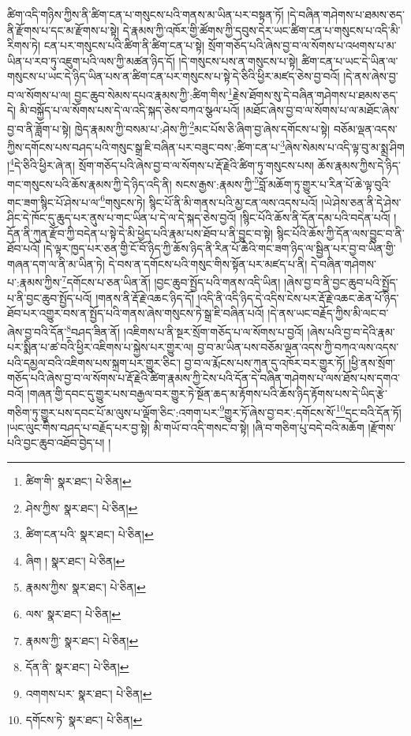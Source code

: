 ཚིག་འདི་གཉིས་ཀྱིས་ནི་ཚིག་ངན་པ་གསུངས་པའི་གནས་མ་ཡིན་པར་བསྟན་ཏོ། །དེ་བཞིན་གཤེགས་པ་ཐམས་ཅད་ནི་རྫོགས་པ་དང་མ་རྫོགས་པ་སྟེ། དེ་རྣམས་ཀྱི་འཁོར་གྱི་ཚོགས་ཀྱི་དབུས་དེར་ཡང་ཚིག་ངན་པ་གསུངས་པ་འདི་མི་རིགས་ཏེ། ངན་པར་གསུངས་པའི་ཚིག་ནི་ཚིག་ངན་པ་སྟེ། སྲོག་གཅོད་པའི་ཞེས་བྱ་བ་ལ་སོགས་པ་འཕགས་པ་མ་ཡིན་པ་རབ་ཏུ་འཇུག་པའི་ལས་ཀྱི་མཚན་ཉིད་དོ། །དེ་གསུངས་པས་ན་གསུངས་པ་སྟེ། ཚིག་ངན་པ་ཡང་དེ་ཡིན་ལ་གསུངས་པ་ཡང་དེ་ཉིད་ཡིན་པས་ན་ཚིག་ངན་པར་གསུངས་པ་སྟེ་དེ་ཅིའི་ཕྱིར་མཛད་ཅེས་བྱ་བའོ། །དེ་ནས་ཞེས་བྱ་བ་ལ་སོགས་པ་ལ། བྱང་ཆུབ་སེམས་དཔའ་རྣམས་ཀྱི་:ཚིག་གིས་\footnote{ཚིག་གི་  སྣར་ཐང་།  པེ་ཅིན། }རྗེས་ཐོགས་སུ་དེ་བཞིན་གཤེགས་པ་ཐམས་ཅད་དེ། མི་བསྐྱོད་པ་ལ་སོགས་པས་དེ་ལ་འདི་སྐད་ཅེས་བཀའ་སྩལ་པའོ། །མཐོང་ཞེས་བྱ་བ་ལ་སོགས་པ་ལ་མཐོང་ཞེས་བྱ་བ་ནི་ཟློག་པ་སྟེ། ཁྱེད་རྣམས་ཀྱི་བསམ་པ་:ཤེས་ཀྱི་\footnote{ཤེས་ཀྱིས་  སྣར་ཐང་།  པེ་ཅིན། }མང་པོས་ཅི་ཞིག་བྱ་ཞེས་དགོངས་པ་སྟེ། བཅོམ་ལྡན་འདས་ཀྱིས་དགོངས་པས་བཤད་པའི་གསུང་སྒྲ་ཇི་བཞིན་པར་བཟུང་བས་:ཚིག་ངན་པ་\footnote{ཚིག་ངན་པའི་  སྣར་ཐང་།  པེ་ཅིན། }ཞེས་སེམས་པ་འདི་ལྟ་བུ་མ་སྨྲ་ཤིག །\footnote{ཞིག །  སྣར་ཐང་།  པེ་ཅིན། }དེ་ཅིའི་ཕྱིར་ཞེ་ན། སྲོག་གཅོད་པའི་ཞེས་བྱ་བ་ལ་སོགས་པ་རྡོ་རྗེའི་ཚིག་ཏུ་གསུངས་པས། ཆོས་རྣམས་ཀྱིས་དེ་ཉིད་གང་གསུངས་པའི་ཆོས་རྣམས་ཀྱི་དེ་ཉིད་འདི་ནི། སངས་རྒྱས་:རྣམས་ཀྱི་\footnote{རྣམས་ཀྱིས་  སྣར་ཐང་།  པེ་ཅིན། }བློ་མཆོག་ཏུ་གྱུར་པ་རིན་པོ་ཆེ་ལྟ་བུའི་གང་ཟག་སྙིང་པོ་ཤེས་པ་ལ་\footnote{ལས་  སྣར་ཐང་།  པེ་ཅིན། }གསུངས་ཏེ། སྙིང་པོ་ནི་མི་གནས་པའི་མྱ་ངན་ལས་འདས་པའོ། །ཡེ་ཤེས་ཅན་ནི་དེ་ཤེས་ཤིང་དེ་ཁོང་དུ་ཆུད་པར་ནུས་པ་གང་ཡིན་པ་དེ་ལ་དེ་སྐད་ཅེས་བྱའོ། །སྙིང་པོའི་ཆོས་ནི་དོན་དམ་པའི་བདེན་པའོ། །དོན་ནི་ཀུན་རྫོབ་ཀྱི་བདེན་པ་སྟེ་དེ་མི་ཕྱེད་པའི་རྣམ་པས་ཐོབ་པ་ནི་བྱུང་བ་སྟེ། སྙིང་པོའི་ཆོས་ཀྱི་དོན་ལས་བྱུང་བ་ནི་ཐོབ་པའོ། །དེ་ལྟར་ཁྱད་པར་ཅན་གྱི་ངོ་བོ་ཉིད་ཀྱི་ཆོས་ཉིད་ནི་རིན་པོ་ཆེའི་གང་ཟག་ཉིད་ལ་སྦྱིན་པར་བྱ་བ་ཡིན་གྱི་གཞན་དག་ལ་ནི་མ་ཡིན་ཏེ། དེ་བས་ན་དགོངས་པའི་གསུང་གིས་སྟོན་པར་མཛད་པ་ནི། དེ་བཞིན་གཤེགས་པ་:རྣམས་ཀྱིས་\footnote{རྣམས་ཀྱི་  སྣར་ཐང་།  པེ་ཅིན། }དགོངས་པ་ཅན་ཡིན་ནོ། །བྱང་ཆུབ་སྤྱོད་པའི་གནས་འདི་ཡིན། །ཞེས་བྱ་བ་ནི་བྱང་ཆུབ་པའི་སྤྱོད་པ་ནི་བྱང་ཆུབ་སྤྱོད་པའོ། །གནས་ནི་རྡོ་རྗེ་འཆང་ཉིད་དོ། །འདི་ནི་འདི་ཉིད་དེ་འདིས་ངེས་པར་རྡོ་རྗེ་འཆང་ཆེན་པོ་ཉིད་ཐོབ་པར་འགྱུར་བས་ན་སྤྱོད་པའི་གནས་ཞེས་གསུངས་ཏེ་སྒྲ་ཇི་བཞིན་པའོ། །དེ་ནས་ཡང་བརྗོད་ཀྱིས་མི་ལང་བ་ཞེས་བྱ་བའི་དོན་\footnote{དོན་ནི་  སྣར་ཐང་།  པེ་ཅིན། }བཤད་ཟིན་ནོ། །འཇིགས་པ་ནི་སྔར་སྲོག་གཅོད་པ་ལ་སོགས་པ་བྱའོ། །ཞེས་པའི་བྱ་བ་དེའི་རྣམ་པར་སྨིན་པ་ཚ་བའི་ཕྱིར་འཇིགས་པ་སྐྱེས་པར་གྱུར་ལ། བྱ་བ་མ་ཡིན་པས་བཅོམ་ལྡན་འདས་ཀྱི་བཀའ་ལས་འདས་པའི་དམྱལ་བའི་འཇིགས་པས་སྐྲག་པར་གྱུར་ཅིང་། བྱ་བ་ལ་རྨོངས་པས་ཀུན་དུ་འཁོར་བར་གྱུར་ཏོ། །ཕྱི་ནས་སྲོག་གཅོད་པའི་ཞེས་བྱ་བ་ལ་སོགས་པ་རྡོ་རྗེའི་ཚིག་རྣམས་ཀྱི་ངེས་པའི་དོན་དེ་བཞིན་གཤེགས་པ་ལས་ཐོས་པས་དགའ་བའོ། །གཞན་གྱི་དབང་དུ་གྱུར་པས་བརྒྱལ་བར་གྱུར་ཏེ་སྔོན་ཆད་མ་རྟོགས་པའི་ཆོས་ཉིད་རྟོགས་པས་དེ་ཡིད་རྩེ་གཅིག་ཏུ་གྱུར་པས་དབང་པོ་མ་ལུས་པ་ལྡོག་ཅིང་:འགག་པར་\footnote{འགགས་པར་  སྣར་ཐང་།  པེ་ཅིན། }གྱུར་ཏོ་ཞེས་བྱ་བར་:དགོངས་སོ་\footnote{དགོངས་ཏེ་  སྣར་ཐང་།  པེ་ཅིན། }དྲང་བའི་དོན་ཏོ། །ཡང་ལུང་གིས་བཤད་པ་བརྗོད་པར་བྱ་སྟེ། མི་གཡོ་བ་འདི་གསང་བ་སྟེ། །ཞི་བ་གཅིག་པུ་བདེ་བའི་མཆོག །རྫོགས་པའི་བྱང་ཆུབ་འཐོབ་བྱེད་པ། །
